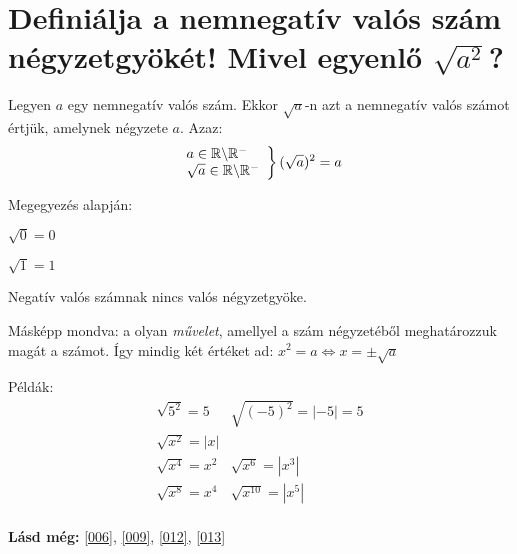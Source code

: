 
\section{Definiálja a nemnegatív valós szám négyzetgyökét! Mivel egyenlő
\texorpdfstring{$\sqrt{a^2}$}{sqrt(a**2)}?}
\label{008}

\begin{defin}[Négyzetgyök]
Legyen $a$ egy nemnegatív valós szám. Ekkor $\sqrt{a}$-n azt a nemnegatív valós
számot értjük, amelynek négyzete $a$. Azaz:
\[
\left.
\begin{array}{l}
  a \in \mathbb{R} \backslash \mathbb{R}^-\\
  \sqrt{a} \in \mathbb{R} \backslash \mathbb{R}^-
\end{array}
\right\} 
(\sqrt{a})^2 = a
\]

Megegyezés alapján:

$\sqrt{0} = 0$

$\sqrt{1} = 1$

Negatív valós számnak nincs valós négyzetgyöke.

Másképp mondva: a  olyan \emph{művelet}, amellyel a
szám négyzetéből meghatározzuk magát a számot. Így mindig két értéket ad:
$x^2 = a \Leftrightarrow x = \pm \sqrt{a}$
\end{defin}

Példák:
\[
\begin{array}{l|r}
  \sqrt{5^2} = 5   & \sqrt{(-5)^2} = |-5| = 5\\\hline
  \sqrt{x^2} = |x| & \\\hline
  \sqrt{x^4} = x^2 & \sqrt{x^6} = |x^3|\\\hline
  \sqrt{x^8} = x^4 & \sqrt{x^{10}} = |x^5|\\
\end{array}
\]

\textbf{Lásd még:} \ref{006}, \ref{009}, \ref{012}, \ref{013}
